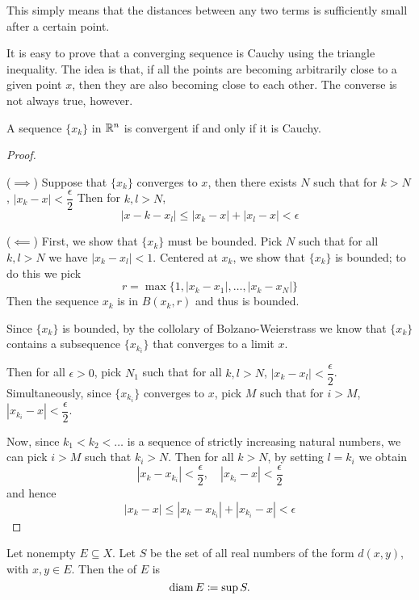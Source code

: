 \begin{remark}
This simply means that the distances between any two terms is sufficiently small after a certain point.
\end{remark}

It is easy to prove that a converging sequence is Cauchy using the triangle inequality. The idea is that, if all the points are becoming arbitrarily close to a given point $x$, then they are also becoming close to each other. The converse is not always true, however.

\begin{proposition}
A sequence $\{x_k\}$ in $\mathbb R^n$ is convergent if and only if it is Cauchy.
\end{proposition}

\begin{proof} \

($\implies$) Suppose that $\{x_k\}$ converges to $x$, then there exists $N$ such that for $k>N$, $|x_k-x|<\dfrac{\epsilon}{2}$
Then for $k,l>N$, 
\[ |x-k-x_l| \le |x_k-x|+|x_l-x| < \epsilon \]

($\impliedby$) First, we show that $\{x_k\}$ must be bounded. 
Pick $N$ such that for all $k,l>N$ we have $|x_k-x_l|<1$. 
Centered at $x_k$, we show that $\{x_k\}$ is bounded; to do this we pick
\[ r = \max\{1,|x_k-x_1|,\dots,|x_k-x_N|\} \]
Then the sequence ${x_k}$ is in $B(x_k,r)$ and thus is bounded.

Since $\{x_k\}$ is bounded, by the collolary of Bolzano-Weierstrass we know that $\{x_k\}$ contains a subsequence $\{x_{k_i}\}$ that converges to a limit $x$.

Then for all $\epsilon>0$, pick $N_1$ such that for all $k,l>N$, $|x_k-x_l|<\dfrac{\epsilon}{2}$. 
Simultaneously, since $\{x_{k_i}\}$ converges to $x$, pick $M$ such that for $i>M$, $|x_{k_i}-x|<\dfrac{\epsilon}{2}$.

Now, since $k_1<k_2<\dots$ is a sequence of strictly increasing natural numbers, we can pick $i>M$ such that $k_i>N$. Then for all $k>N$, by setting $l=k_i$ we obtain
\[ |x_k-x_{k_i}| < \frac{\epsilon}{2}, \quad |x_{k_i}-x| < \frac{\epsilon}{2} \]
and hence
\[ |x_k-x| \le |x_k-x_{k_i}|+|x_{k_i}-x| < \epsilon \]
\end{proof}

\begin{definition}
Let nonempty $E\subseteq X$. Let $S$ be the set of all real numbers of the form $d(x,y)$, with $x,y\in E$. Then the  of $E$ is 
\[ \operatorname{diam} E\coloneqq\sup S. \]

\end{definition}
\pagebreak

